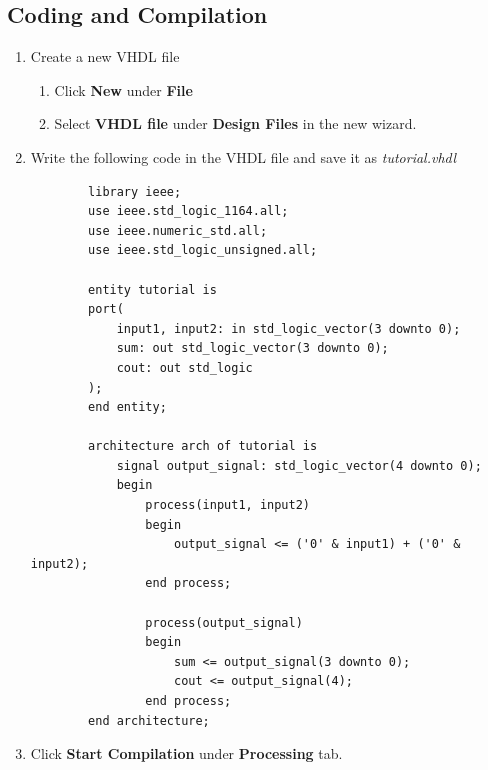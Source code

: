 \documentclass{article}
\begin{document}
	\subsection{Coding and Compilation}
	\begin{enumerate}
		\item Create a new VHDL file
		\begin{enumerate}
			\item Click \textbf{New} under \textbf{File}
			\item Select \textbf{VHDL file} under \textbf{Design Files} in the new wizard.
		\end{enumerate}
		\item Write the following code in the VHDL file and save it as \textit{tutorial.vhdl}
		
		\begin{lstlisting}
		library ieee;
		use ieee.std_logic_1164.all;
		use ieee.numeric_std.all;
		use ieee.std_logic_unsigned.all;
		
		entity tutorial is
		port(
			input1, input2: in std_logic_vector(3 downto 0);
			sum: out std_logic_vector(3 downto 0);
			cout: out std_logic
		);
		end entity;
		
		architecture arch of tutorial is
			signal output_signal: std_logic_vector(4 downto 0);
			begin
				process(input1, input2)
				begin
					output_signal <= ('0' & input1) + ('0' & input2);
				end process;
				
				process(output_signal)
				begin
					sum <= output_signal(3 downto 0);
					cout <= output_signal(4);
				end process;
		end architecture;
		\end{lstlisting}
		\item Click \textbf{Start Compilation} under \textbf{Processing} tab.
	\end{enumerate}
\end{document}
